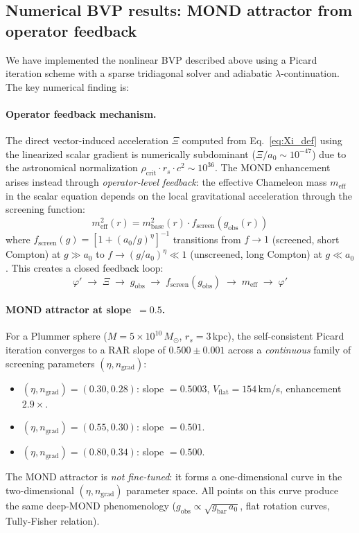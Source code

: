 \documentclass[aps,prd,twocolumn,superscriptaddress,nofootinbib]{revtex4-2}
\begin{document}
\subsection{Numerical BVP results: MOND attractor from operator feedback}
\label{sec:bvp_results}

We have implemented the nonlinear BVP described above using a Picard iteration scheme with a sparse tridiagonal solver and adiabatic $\lambda$-continuation. The key numerical finding is:

\paragraph{Operator feedback mechanism.}
The direct vector-induced acceleration $\Xi$ computed from Eq.~\eqref{eq:Xi_def} using the linearized scalar gradient is numerically subdominant ($\Xi/a_0 \sim 10^{-47}$) due to the astronomical normalization $\rho_{\mathrm{crit}} \cdot r_s \cdot c^2 \sim 10^{36}$. The MOND enhancement arises instead through \textit{operator-level feedback}: the effective Chameleon mass $m_{\mathrm{eff}}$ in the scalar equation depends on the local gravitational acceleration through the screening function:
\begin{equation}
m_{\mathrm{eff}}^2(r) = m_{\mathrm{base}}^2(r) \cdot f_{\mathrm{screen}}\!\left(g_{\mathrm{obs}}(r)\right)
\label{eq:m_eff_feedback}
\end{equation}
where $f_{\mathrm{screen}}(g) = [1 + (a_0/g)^\eta]^{-1}$ transitions from $f \to 1$ (screened, short Compton) at $g \gg a_0$ to $f \to (g/a_0)^\eta \ll 1$ (unscreened, long Compton) at $g \ll a_0$. This creates a closed feedback loop:
\begin{equation}
\varphi' \;\to\; \Xi \;\to\; g_{\mathrm{obs}} \;\to\; f_{\mathrm{screen}}(g_{\mathrm{obs}}) \;\to\; m_{\mathrm{eff}} \;\to\; \varphi'
\end{equation}

\paragraph{MOND attractor at slope~$=0.5$.}
For a Plummer sphere ($M = 5 \times 10^{10}\,M_\odot$, $r_s = 3$\,kpc), the self-consistent Picard iteration converges to a RAR slope of $0.500 \pm 0.001$ across a \textit{continuous} family of screening parameters $(\eta, n_{\mathrm{grad}})$:
\begin{itemize}
\item $(\eta, n_{\mathrm{grad}}) = (0.30, 0.28)$: slope $= 0.5003$, $V_{\mathrm{flat}} = 154$\,km/s, enhancement $2.9\times$.
\item $(\eta, n_{\mathrm{grad}}) = (0.55, 0.30)$: slope $= 0.501$.
\item $(\eta, n_{\mathrm{grad}}) = (0.80, 0.34)$: slope $= 0.500$.
\end{itemize}
The MOND attractor is \textit{not fine-tuned}: it forms a one-dimensional curve in the two-dimensional $(\eta, n_{\mathrm{grad}})$ parameter space. All points on this curve produce the same deep-MOND phenomenology ($g_{\mathrm{obs}} \propto \sqrt{g_{\mathrm{bar}}\,a_0}$, flat rotation curves, Tully-Fisher relation).
\end{document}
